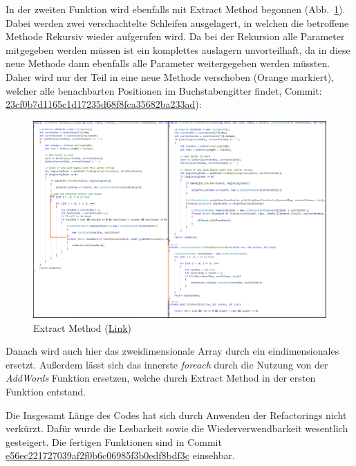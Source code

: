 In der zweiten Funktion wird ebenfalls mit Extract Method begonnen (Abb.~\ref{Abb:ExtractMethod2}). Dabei werden zwei verschachtelte Schleifen ausgelagert, in welchen die betroffene Methode Rekursiv wieder aufgerufen wird. Da bei der Rekursion alle Parameter mitgegeben werden müssen ist ein komplettes auslagern unvorteilhaft, da in diese neue Methode dann ebenfalls alle Parameter weitergegeben werden müssten. Daher wird nur der Teil in eine neue Methode verschoben (Orange markiert), welcher alle benachbarten Positionen im Buchstabengitter findet, Commit: \href{https://github.com/EinToni/Wortfinder/commit/23cf0b7d1165c1d17235d68f8fca35682ba233ad}{23cf0b7d1165c1d17235d68f8fca35682ba233ad}):
\newpage
\begin{figure}[!ht]
  \centering
  \includegraphics[width=\textwidth]{Bilder/ExtractMethod2.PNG}
  \caption[Extract Method]{Extract Method (\href{https://github.com/EinToni/WortfinderDoku/blob/main/Bilder/ExtractMethod2.png}{Link})}
  \label{Abb:ExtractMethod2}
\end{figure}

Danach wird auch hier das zweidimensionale Array durch ein eindimensionales ersetzt. Außerdem lässt sich das innerste \textit{foreach} durch die Nutzung von der \textit{AddWords} Funktion ersetzen, welche durch Extract Method in der ersten Funktion entstand. 


Die Insgesamt Länge des Codes hat sich durch Anwenden der Refactorings nicht verkürzt. Dafür wurde die Lesbarkeit sowie die Wiederverwendbarkeit wesentlich gesteigert. Die fertigen Funktionen sind in Commit \href{https://github.com/EinToni/Wortfinder/commit/e56ec221727039af2f0b6c06985f3b0edf8bdf3c}{e56ec221727039af2f0b6c06985f3b0edf8bdf3c} einsehbar.

